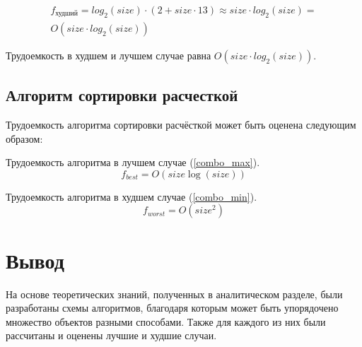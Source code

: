 \begin{equation}
	\begin{array}{cc}
		f_{\text{худший}} = log_2(size) \cdot (2 + size \cdot 13) \approx  size \cdot log_2(size) = \\O(size \cdot log_2(size))             
	\end{array}
\end{equation}

Трудоемкость в худшем и лучшем случае равна $O(size \cdot log_2(size))$.

\subsection{Алгоритм сортировки расчесткой}
Трудоемкость алгоритма сортировки расчёсткой может быть оценена следующим образом:

Трудоемкость алгоритма в лучшем случае (\ref{combo_max}).
\begin{equation}
	\label{combo_max}
	f_{best} = O(size\log(size))
\end{equation}

Трудоемкость алгоритма в худшем случае (\ref{combo_min}).
\begin{equation}
	\label{combo_min}
	f_{worst} = O(size^{2})
\end{equation}

\section*{Вывод}

На основе теоретических знаний, полученных в аналитическом разделе, были разработаны схемы алгоритмов, благодаря которым может быть упорядочено множество объектов разными способами. 
Также для каждого из них были рассчитаны и оценены лучшие и худшие случаи.
